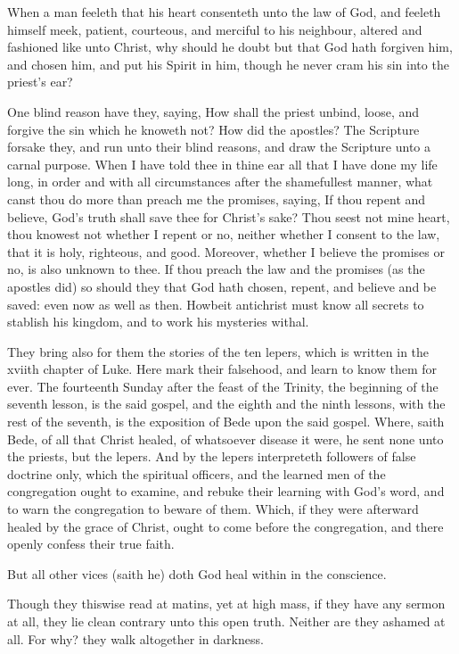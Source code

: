 When a man feeleth that his heart consenteth unto the 
law of God, and feeleth himself meek, patient, courteous, 
and merciful to his neighbour, altered and fashioned like 
unto Christ, why should he doubt but that God hath forgiven 
him, and chosen him, and put his Spirit in him, though 
he never cram his sin into the priest's ear? 

One blind reason have they, saying, How shall the 
priest unbind, loose, and forgive the sin which he knoweth 
not? How did the apostles? The Scripture forsake 
they, and run unto their blind reasons, and draw the 
Scripture unto a carnal purpose. When I have told thee 
in thine ear all that I have done my life long, in order and 
with all circumstances after the shamefullest manner, what 
canst thou do more than preach me the promises, saying, 
If thou repent and believe, God's truth shall save thee 
for Christ's sake? Thou seest not mine heart, thou 
knowest not whether I repent or no, neither whether I 
consent to the law, that it is holy, righteous, and good. 
Moreover, whether I believe the promises or no, is also 
unknown to thee. If thou preach the law and the promises
(as the apostles did) so should they that God hath 
chosen, repent, and believe and be saved: even now as 
well as then. Howbeit antichrist must know all secrets 
to stablish his kingdom, and to work his mysteries withal. 

They bring also for them the stories of the ten lepers, 
which is written in the xviith chapter of Luke. Here 
mark their falsehood, and learn to know them for ever. 
The fourteenth Sunday after the feast of the Trinity, the 
beginning of the seventh lesson, is the said gospel, and 
the eighth and the ninth lessons, with the rest of the 
seventh, is the exposition of Bede upon the said gospel. 
Where, saith Bede, of all that Christ healed, of whatsoever
disease it were, he sent none unto the priests, but 
the lepers. And by the lepers interpreteth followers of 
false doctrine only, which the spiritual officers, and the 
learned men of the congregation ought to examine, and 
rebuke their learning with God's word, and to warn the
congregation to beware of them. Which, if they were 
afterward healed by the grace of Christ, ought to come 
before the congregation, and there openly confess their 
true faith. 

But all other vices (saith he) doth God heal within in 
the conscience. 

Though they thiswise read at matins, yet at high mass, if 
they have any sermon at all, they lie clean contrary unto this 
open truth. Neither are they ashamed at all. For why? 
they walk altogether in darkness. 


